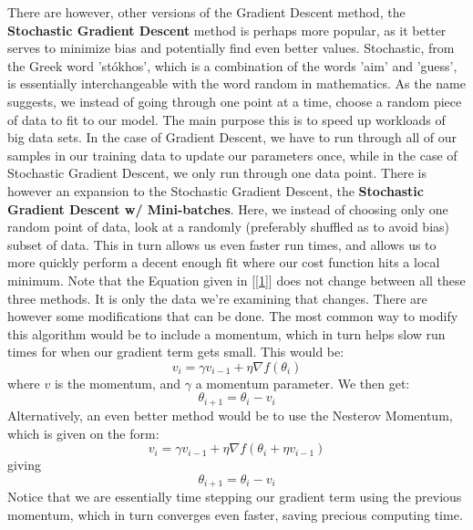 \documentclass{article}
\begin{document}
There are however, other versions of the Gradient Descent method, the \textbf{Stochastic Gradient Descent} method is perhaps more popular, as it better serves to minimize bias and potentially find even better values.
\newline Stochastic, from the Greek word 'stókhos', which is a combination of the words 'aim' and 'guess', is essentially interchangeable with the word random in mathematics. As the name suggests, we instead of going through one point at a time, choose a random piece of data to fit to our model. The main purpose this is to speed up workloads of big data sets. In the case of Gradient Descent, we have to run through all of our samples in our training data to update our parameters once, while in the case of Stochastic Gradient Descent, we only run through one data point. \newline
There is however an expansion to the Stochastic Gradient Descent, the \textbf{Stochastic Gradient Descent w/ Mini-batches}. \newline
Here, we instead of choosing only one random point of data, look at a randomly (preferably shuffled as to avoid bias) subset of data. This in turn allows us even faster run times, and allows us to more quickly perform a decent enough fit where our cost function hits a local minimum. \newline
Note that the Equation given in [\ref{1}] does not change between all these three methods. It is only the data we're examining that changes. There are however some modifications that can be done. \newline
The most common way to modify this algorithm would be to include a momentum, which in turn helps slow run times for when our gradient term gets small. This would be:
\begin{equation*}
    v_i = \gamma v_{i-1} + \eta \nabla f(\theta_i)
\end{equation*}
where $v$ is the momentum, and $\gamma$ a momentum parameter. We then get:
\begin{equation}
    \theta_{i+1} = \theta_i - v_i
\end{equation}
Alternatively, an even better method would be to use the Nesterov Momentum, which is given on the form:
\begin{equation*}
    v_i = \gamma v_{i-1} + \eta \nabla f(\theta_i + \eta v_{i-1})
\end{equation*}
giving
\begin{equation}
    \theta_{i+1} = \theta_i - v_i
\end{equation}
Notice that we are essentially time stepping our gradient term using the previous momentum, which in turn converges even faster, saving precious computing time. \newpage
\end{document}

